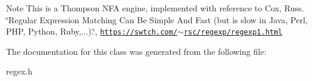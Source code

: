 \begin{DoxyNote}{Note}
This is a Thompson N\+FA engine, implemented with reference to Cox, Russ. \char`\"{}\+Regular Expression Matching Can Be Simple And Fast (but is slow in Java, Perl, P\+H\+P, Python, Ruby,...).\char`\"{}, \href{https://swtch.com/~rsc/regexp/regexp1.html}{\tt https\+://swtch.\+com/$\sim$rsc/regexp/regexp1.\+html} 
\end{DoxyNote}


The documentation for this class was generated from the following file\+:\begin{DoxyCompactItemize}
\item 
regex.\+h\end{DoxyCompactItemize}
